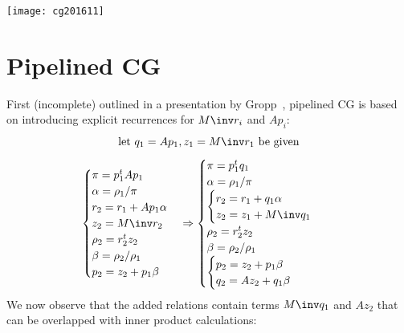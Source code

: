 \documentclass[11pt,fleqn,preprint]{impreport}
\begin{document}
\texttt{[image: cg201611]}

\section{Pipelined CG}

First (incomplete) outlined in a presentation by Gropp~\cite{Gropp:libraries},
pipelined CG is based on
introducing explicit recurrences for $M\inv r_i$ and $Ap_i$:
\[ \hbox{let $q_1=Ap_1, z_1=M\inv r_1$ be given} \]
\[
\begin{cases}
  \pi = p_1^tAp_1\\ \alpha = \rho_1 /\pi \\
  r_2 = r_1 + Ap_1\alpha\\
  z_2 = M\inv r_2\\
  \rho_2 = r_2^tz_2\\ \beta=\rho_2/\rho_1 \\
  p_2 = z_2 + p_1\beta\\
\end{cases}
\Rightarrow
\begin{cases}
  \pi = p_1^tq_1\\ \alpha = \rho_1 /\pi \\
  \begin{cases}
  r_2 = r_1 + q_1\alpha\\ z_2 = z_1+ M\inv q_1 \\
  \end{cases}\\  
  \rho_2 = r_2^tz_2\\ \beta=\rho_2/\rho_1 \\
  \begin{cases}
    p_2 = z_2 + p_1\beta\\
    q_2 = Az_2+q_1\beta\\
  \end{cases}\\  
\end{cases}
\]
We now observe that the added relations contain terms $M\inv q_1$ and
$Az_2$ that can be overlapped with inner product calculations:
\end{document}
